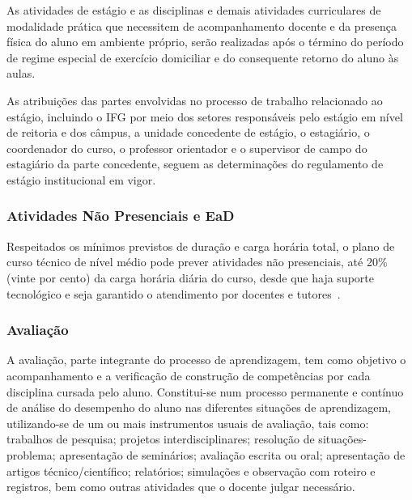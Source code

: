 \documentclass[11pt,fleqn]{book} %
\begin{document}
As atividades de estágio e as disciplinas e demais atividades curriculares de modalidade prática que necessitem de acompanhamento docente e da presença física do aluno em ambiente próprio, serão realizadas após o término do período de regime especial de exercício domiciliar e do consequente retorno do aluno às aulas.

As atribuições das partes envolvidas no processo de trabalho relacionado ao estágio, incluindo o IFG por meio dos setores responsáveis pelo estágio em nível de reitoria e dos câmpus, a unidade concedente de estágio, o estagiário, o coordenador do curso, o professor orientador e o supervisor de campo do estagiário da parte concedente, seguem as determinações do regulamento de estágio institucional em vigor.

\subsubsection{Atividades Não Presenciais e EaD}
\indent

Respeitados os mínimos previstos de duração e carga horária total, o plano de curso técnico de nível médio pode prever atividades não presenciais, até 20\% (vinte por cento) da carga horária diária do curso, desde que haja suporte tecnológico e seja garantido o atendimento por docentes e tutores~\cite{Resolucao06De2012}.

\subsubsection{Avaliação}

A avaliação, parte integrante do processo de aprendizagem, tem como objetivo o acompanhamento e a verificação de construção de competências por cada disciplina cursada pelo aluno.
Constitui-se num processo permanente e contínuo de análise do desempenho do aluno nas diferentes situações de aprendizagem, utilizando-se de um ou mais instrumentos usuais de avaliação, tais como: trabalhos de pesquisa; projetos interdisciplinares; resolução de situações-problema; apresentação de seminários; avaliação escrita ou oral; apresentação de artigos técnico/científico; relatórios; simulações e observação com roteiro e registros, bem como outras atividades que o docente julgar necessário.
\end{document}
